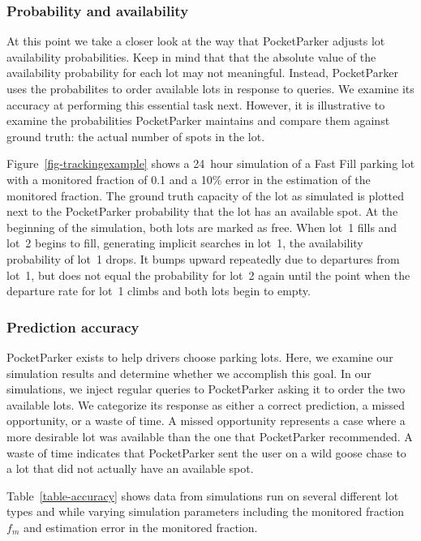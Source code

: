 \subsubsection{Probability and availability}

At this point we take a closer look at the way that PocketParker adjusts lot
availability probabilities. Keep in mind that that the absolute value of the
availability probability for each lot may not meaningful. Instead,
PocketParker uses the probabilites to order available lots in response to
queries. We examine its accuracy at performing this essential task next.
However, it is illustrative to examine the probabilities PocketParker
maintains and compare them against ground truth: the actual number of spots
in the lot.

Figure~\ref{fig-trackingexample} shows a 24~hour simulation of a Fast Fill
parking lot with a monitored fraction of 0.1 and a 10\% error in the
estimation of the monitored fraction. The ground truth capacity of the lot as
simulated is plotted next to the PocketParker probability that the lot has an
available spot. At the beginning of the simulation, both lots are marked as
free. When lot~1 fills and lot~2 begins to fill, generating implicit searches
in lot~1, the availability probability of lot~1 drops. It bumps upward
repeatedly due to departures from lot~1, but does not equal the probability
for lot~2 again until the point when the departure rate for lot~1 climbs and
both lots begin to empty.

\subsubsection{Prediction accuracy}



PocketParker exists to help drivers choose parking lots. Here, we examine our
simulation results and determine whether we accomplish this goal. In our
simulations, we inject regular queries to PocketParker asking it to order the
two available lots. We categorize its response as either a correct
prediction, a missed opportunity, or a waste of time. A missed opportunity
represents a case where a more desirable lot was available than the one that
PocketParker recommended. A waste of time indicates that PocketParker sent
the user on a wild goose chase to a lot that did not actually have an
available spot.

Table~\ref{table-accuracy} shows data from simulations run on several
different lot types and while varying simulation parameters including the
monitored fraction $f_m$ and estimation error in the monitored fraction.

